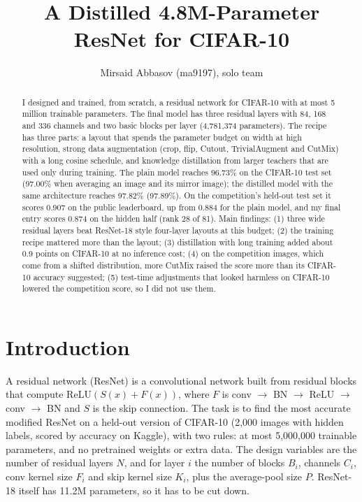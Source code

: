 \documentclass[letterpaper]{article}
\title{A Distilled 4.8M-Parameter ResNet for CIFAR-10}
\author{
    Mirsaid Abbasov (ma9197), solo team
}
\begin{document}
\maketitle

\begin{abstract}
I designed and trained, from scratch, a residual network for CIFAR-10 with at most 5 million trainable parameters.
The final model has three residual layers with 84, 168 and 336 channels and two basic blocks per layer
(4,781,374 parameters). The recipe has three parts: a layout that spends the parameter budget on width at high
resolution, strong data augmentation (crop, flip, Cutout, TrivialAugment and CutMix) with a long cosine schedule, and
knowledge distillation from larger teachers that are used only during training. The plain model reaches 96.73\%
on the CIFAR-10 test set (97.00\% when averaging an image and its mirror image); the distilled model with the same
architecture reaches 97.82\% (97.89\%). On the competition's held-out test set it scores 0.907 on the public
leaderboard, up from 0.884 for the plain model, and my final entry scores 0.874 on the hidden half (rank 28 of 81). Main findings: (1) three wide residual layers beat ResNet-18 style
four-layer layouts at this budget; (2) the training recipe mattered more than the layout; (3) distillation with long
training added about 0.9 points on CIFAR-10 at no inference cost; (4) on the competition images, which come from a
shifted distribution, more CutMix raised the score more than its CIFAR-10 accuracy suggested; (5) test-time
adjustments that looked harmless on CIFAR-10 lowered the competition score, so I did not use them.
\end{abstract}

\section{Introduction}
A residual network (ResNet) \cite{he2016deep} is a convolutional network built from residual blocks that compute
$\mathrm{ReLU}(S(x) + F(x))$, where $F$ is conv $\rightarrow$ BN $\rightarrow$ ReLU $\rightarrow$ conv
$\rightarrow$ BN \cite{ioffe2015batch} and $S$ is the skip connection. The task is to find the most accurate
modified ResNet on a held-out version of CIFAR-10 \cite{krizhevsky2009learning} (2,000 images with hidden labels,
scored by accuracy on Kaggle), with two rules: at most 5,000,000 trainable parameters, and no pretrained weights or
extra data. The design variables are the number of residual layers $N$, and for layer $i$ the number of blocks
$B_i$, channels $C_i$, conv kernel size $F_i$ and skip kernel size $K_i$, plus the average-pool size $P$.
ResNet-18 itself has 11.2M parameters, so it has to be cut down.
\end{document}
